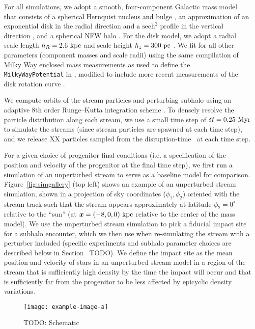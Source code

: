 For all simulations, we adopt a smooth, four-component Galactic mass model that consists
of a spherical Hernquist nucleus and bulge \citep{Hernquist:1992}, an approximation of
an exponential disk in the radial direction and a $\textrm{sech}^2$ profile in the
vertical direction \citep{Smith:2015}, and a spherical NFW halo \citep{Navarro:1996}.
For the disk model, we adopt a radial scale length $h_R = 2.6~\mathrm{kpc}$ and scale height
$h_z = 300~\mathrm{pc}$ \citep{Bland-Hawthorn:2016}.
We fit for all other parameters (component masses and scale radii) using the same
compilation of Milky Way enclosed mass measurements as used to define the
\texttt{MilkyWayPotential} in \gala \citep{gala}, modified to include more recent
measurements of the disk rotation curve \citep{Eilers:2019}.

We compute orbits of the stream particles and perturbing subhalo using an adaptive 8th
order Runge--Kutta integration scheme \citep{Hairer:1991}.
To densely resolve the particle distribution along each stream, we use a small time step
of $\delta t = 0.25~\mathrm{Myr}$ to simulate the streams (since stream particles are spawned at
each time step), and we release {\color{red} XX} particles sampled from the
disruption-time \df\ at each time step.

For a given choice of progenitor final conditions (i.e. a specification of the position
and velocity of the progenitor at the final time step), we first run a simulation of an
unperturbed stream to serve as a baseline model for comparison.
Figure~\ref{fig:simgallery} (top left) shows an example of an unperturbed stream
simulation, shown in a projection of sky coordinates ($\phi_1, \phi_2$) oriented with
the stream track such that the stream appears approximately at latitude $\phi_2=0^\circ$
relative to the ``sun'' (at $\boldsymbol{x} = (-8, 0, 0)~\mathrm{kpc}$ relative to the center of the
mass model).
We use the unperturbed stream simulation to pick a fiducial impact site for a subhalo
encounter, which we then use when re-simulating the stream with a perturber included
(specific experiments and subhalo parameter choices are described below in
Section~{\color{red} TODO}).
We define the impact site as the mean position and velocity of stars in an unperturbed
stream model in a region of the stream that is sufficiently high density by the time
the impact will occur and that is sufficiently far from the progenitor to be less
affected by epicyclic density variations.

\begin{figure*}[!th]
\begin{center}
\texttt{[image: example-image-a]} %
\end{center}
\caption{%
TODO: Schematic
\label{fig:schematic}
}
\end{figure*}

